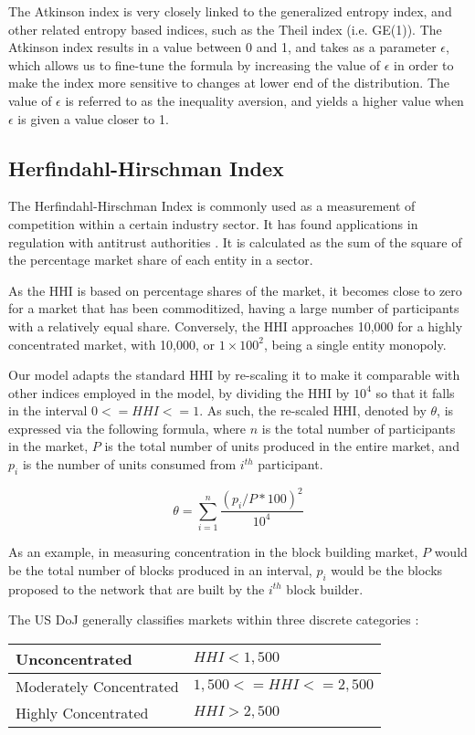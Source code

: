 \documentclass[conference]{IEEEtran}
\begin{document}
The Atkinson index is very closely linked to the generalized entropy index, and other related entropy based indices, such as the Theil index (i.e. GE(1)).  The Atkinson index results in a value between 0 and 1, and takes as a parameter $\epsilon$, which allows us to fine-tune the formula by increasing the value of $\epsilon$ in order to make the index more sensitive to changes at lower end of the distribution.  The value of $\epsilon$ is referred to as the inequality aversion, and yields a higher value when $\epsilon$ is given a value closer to 1.

\subsection{Herfindahl-Hirschman Index}

The Herfindahl-Hirschman Index is commonly used as a measurement of competition within a certain industry sector. It has found applications in regulation with antitrust authorities \cite{usdoj2015}. It is calculated as the sum of the square of the percentage market share of each entity in a sector.

As the HHI is based on percentage shares of the market, it becomes close to zero for a market that has been commoditized, having a large number of participants with a relatively equal share.  Conversely, the HHI approaches 10,000 for a highly concentrated market, with 10,000, or $1 \times 100^2 $, being a single entity monopoly.

Our model adapts the standard HHI by re-scaling it to make it comparable with other indices employed in the model, by dividing the HHI by $10^4$ so that it falls in the interval $0 <= HHI <= 1$. As such, the re-scaled HHI, denoted by $\theta$, is expressed via the following formula, where $n$ is the total number of participants in the market, $P$ is the total number of units produced in the entire market, and $p_i$ is the number of units consumed from $i^{th}$ participant.

\[\theta = \sum_{i=1}^{n} \frac{(p_{i}/P*100)^{2}}{10^{4}}
\]

As an example, in measuring concentration in the block building market, $P$ would be the total number of blocks produced in an interval,  $p_i$ would be the blocks proposed to the network that are built by the $i^{th}$ block builder.

The US DoJ generally classifies markets within three discrete categories \cite{usdoj2015}:

\begin{center}
\begin{tabular}{|l|l|}
\hline
Unconcentrated & $HHI < 1,500$  \\ \hline
Moderately Concentrated & $1,500 <= HHI <= 2,500$ \\ \hline
Highly Concentrated & $HHI > 2,500$ \\ \hline
\end{tabular}
\end{center}
\end{document}
